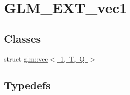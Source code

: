 \hypertarget{group__ext__vec1}{}\section{G\+L\+M\+\_\+\+E\+X\+T\+\_\+vec1}
\label{group__ext__vec1}
\subsection*{Classes}
\begin{DoxyCompactItemize}
\item 
struct \mbox{\hyperlink{structglm_1_1vec_3_011_00_01_t_00_01_q_01_4}{glm\+::vec$<$ 1, T, Q $>$}}
\end{DoxyCompactItemize}
\subsection*{Typedefs}
